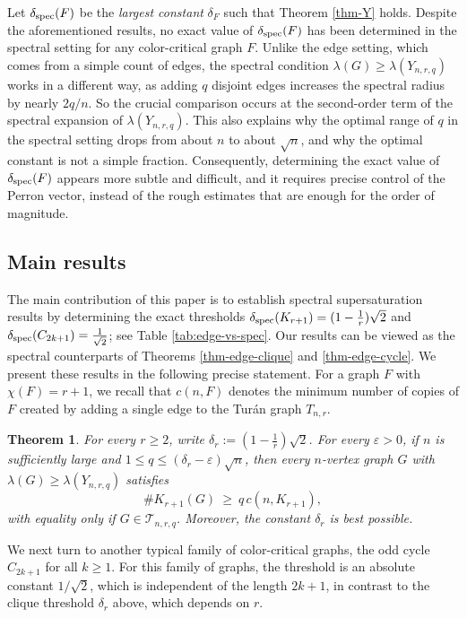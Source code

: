 \documentclass[11pt,a4paper]{article}
\newtheorem{theorem}{Theorem}[section]
\theoremstyle{definition}
\theoremstyle{plain}
\renewcommand{\le}{\leqslant}
\renewcommand{\ge}{\geqslant}
\begin{document}
\smallskip 
Let $\delta_{\rm spec} (F)$ be the {\it largest constant} $\delta_F$  such that Theorem \ref{thm-Y} holds. 
Despite the aforementioned results, no exact value of $\delta_{\rm spec} (F)$ has been determined in the spectral
setting for any color-critical graph $F$.   
Unlike the edge setting, which comes from a simple count of edges, the spectral condition $\lambda(G)\ge\lambda(Y_{n,r,q})$ works in a different way, as adding $q$ disjoint edges increases the spectral radius by nearly $2q/n$. So the crucial comparison occurs at the second-order term of the spectral expansion of $\lambda(Y_{n,r,q})$. This also explains why the optimal range of $q$ in the spectral setting drops from about $n$ to about $\sqrt n$, and why the optimal constant is not a simple fraction. Consequently, determining the exact value of $\delta_{\rm spec}(F)$ appears more subtle and difficult, and it requires precise control of the Perron vector, instead of the rough estimates that are enough for the order
of magnitude.   



\subsection{Main results}


The main contribution of this paper is to establish 
spectral supersaturation results by determining the exact thresholds $\delta_{\rm spec}(K_{r+1}) =(1-\frac{1}{r})\sqrt{2} $ and $\delta_{\rm spec}(C_{2k+1}) = \frac{1}{\sqrt{2}}$; see Table \ref{tab:edge-vs-spec}.     
Our results can be viewed as the spectral counterparts of Theorems \ref{thm-edge-clique} and \ref{thm-edge-cycle}.  
We present these results in the following precise statement. 
 For a graph $F$ with $\chi (F)=r+1$, 
 we recall that $c(n,F)$ denotes the minimum number of copies of $F$ created by adding a single edge to the Tur\'{a}n graph $T_{n,r}$. 


\begin{theorem} 
\label{thm-cliques}
For every $r\ge 2$, write  
$ \delta_r :=(1-\frac{1}{r})\sqrt{2}$.  
 For every  $\varepsilon>0$, if $n$ is sufficiently large and $ 1\le q\le (\delta_r -\varepsilon)\sqrt n$, 
then every $n$-vertex graph $G$ with 
$ \lambda(G)\ge \lambda(Y_{n,r,q})$ 
satisfies 
$$ \texttt{\#}K_{r+1}(G)\ \ge \ q\,c(n,K_{r+1}),$$
 with equality  only if $G\in \mathcal{T}_{n,r,q}$. 
Moreover, the constant $\delta_r$ is best possible. 
\end{theorem}

We next turn to another typical family of color-critical graphs, the odd cycle $C_{2k+1}$ for all $k\ge 1$.
For this family of graphs, the threshold is an absolute constant  $1/\sqrt2$, which is independent of the length
$2k+1$, in contrast to the clique threshold $\delta_r$ above, which depends on $r$.
\end{document}
